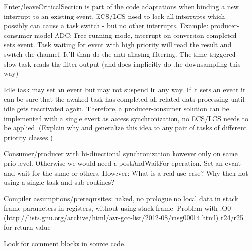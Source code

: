 Enter/leaveCriticalSection is part of the code adaptations when binding a
new interrupt to an existing event. ECS/LCS need to lock all interrupts
which possibly can cause a task switch - but no other interrupts.
  Example: producer-consumer model ADC: Free-running mode, interrupt on
conversion completed sets event. Task waiting for event with high priority
will read the result and switch the channel. It'll than do the
anti-aliasing filtering. The time-triggered slow task reads the filter
output (and does implicitly do the downsampling this way).

Idle task may set an event but may not suspend in any way. If it sets an
event it can be sure that the awaked task has completed all related data
processing until idle gets reactivated again. Therefore, a
producer-consumer solution can be implemented with a single event as
access synchronization, no ECS/LCS needs to be applied. (Explain why and
generalize this idea to any pair of tasks of different priority classes.)

Consumer/producer with bi-directional synchronization however only on same
prio level. Otherwise we would need a postAndWaitFor operation. Set an
event and wait for the same or others. However: What is a real use case?
Why then not using a single task and sub-routines?

Compiler assumptions/prerequisites:
  naked, no prologue
  no local data in stack frame
  parameters in registers, without using stack frame: Problem with .O0 (http://lists.gnu.org/archive/html/avr-gcc-list/2012-08/msg00014.html)
  r24/r25 for return value 

Look for comment blocks in source code.

